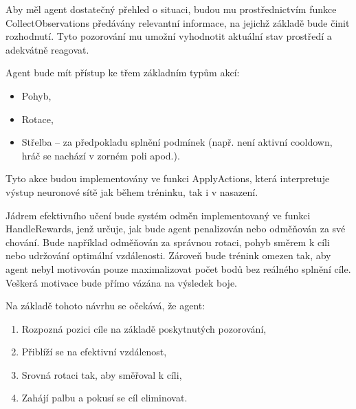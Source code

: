 Aby měl agent dostatečný přehled o situaci, budou mu prostřednictvím funkce CollectObservations předávány relevantní informace, na jejichž základě bude činit rozhodnutí. Tyto pozorování mu umožní vyhodnotit aktuální stav prostředí a adekvátně reagovat.

\newpage

Agent bude mít přístup ke třem základním typům akcí:
\begin{itemize}
\item Pohyb,
\item Rotace,
\item Střelba – za předpokladu splnění podmínek (např. není aktivní cooldown, hráč se nachází v zorném poli apod.).
\end{itemize}

Tyto akce budou implementovány ve funkci ApplyActions, která interpretuje výstup neuronové sítě jak během tréninku, tak i v nasazení.

Jádrem efektivního učení bude systém odměn implementovaný ve funkci HandleRewards, jenž určuje, jak bude agent penalizován nebo odměňován za své chování. Bude například odměňován za správnou rotaci, pohyb směrem k cíli nebo udržování optimální vzdálenosti. Zároveň bude trénink omezen tak, aby agent nebyl motivován pouze maximalizovat počet bodů bez reálného splnění cíle. Veškerá motivace bude přímo vázána na výsledek boje.

Na základě tohoto návrhu se očekává, že agent:
\begin{enumerate}
\item Rozpozná pozici cíle na základě poskytnutých pozorování,
\item Přiblíží se na efektivní vzdálenost,
\item Srovná rotaci tak, aby směřoval k cíli,
\item Zahájí palbu a pokusí se cíl eliminovat.
\end{enumerate}